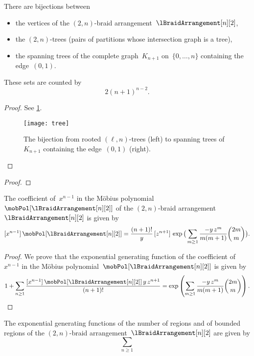 \begin{theorem}
There are bijections between
\begin{itemize}
\item the vertices of the $(2,n)$-braid arrangement~$\lBraidArrangement[n][2]$,
\item the $(2,n)$-trees (\ie pairs of partitions whose intersection graph is a tree),
\item the spanning trees of the complete graph~$K_{n+1}$ on~$\{0, \dots, n\}$ containing the edge~$(0,1)$.
\end{itemize}
These sets are counted by
\[
2 (n + 1)^{n-2}.
\]
\end{theorem}

\begin{proof}
See \cref{fig:tree}.
%
\begin{figure}
	\centerline{\texttt{[image: tree]}}
	\caption{The bijection from rooted $(\ell,n)$-trees (left) to spanning trees of~$K_{n+1}$ containing the edge~$(0,1)$ (right).}
	\label{fig:tree}
\end{figure}
\end{proof}

\begin{theorem}
\end{theorem}

\begin{proof}
\end{proof}

\begin{theorem}
The coefficient of~$x^{n-1}$ in the M\"obius polynomial~$\mobPol[{\lBraidArrangement[n][2]}]$ of the $(2,n)$-braid arrangement~$\lBraidArrangement[n][2]$ is given by
\[
[x^{n-1}] \, \mobPol[{\lBraidArrangement[n][2]}] = \frac{(n+1)!}{y} \, [z^{n+1}] \, \exp \big( \sum_{m \ge 1} \frac{- y \, z^m}{m(m+1)} \binom{2m}{m} \big).
\]
\end{theorem}

\begin{proof}
We prove that the exponential generating function of the coefficient of~$x^{n-1}$ in the M\"obius polynomial~$\mobPol[{\lBraidArrangement[n][2]}]$ is given by
\[
1 + \sum_{n \ge 1} \frac{[x^{n-1}] \, \mobPol[{\lBraidArrangement[n][2]}] \, y \, z^{n+1}}{(n+1)!} = \exp \left( \sum_{m \ge 1} \frac{- y \, z^m}{m(m+1)} \binom{2m}{m} \right).
\]
\end{proof}

\begin{corollary}
The exponential generating functions of the number of regions and of bounded regions of the $(2,n)$-braid arrangement~$\lBraidArrangement[n][2]$ are given by
\[
\sum_{n \ge 1} 
\]
\end{corollary}

